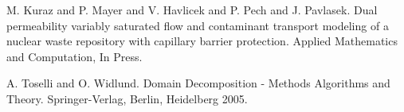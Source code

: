 
\begin{thebibliography}{10}

{\sc M. Kuraz and P. Mayer and V. Havlicek and P. Pech and J. Pavlasek}. {Dual permeability variably saturated flow and contaminant transport modeling of a nuclear waste repository with capillary barrier protection}. Applied Mathematics and Computation, In Press.



{\sc A. Toselli and O. Widlund}. {Domain Decomposition - Methods Algorithms and Theory}. Springer-Verlag, Berlin, Heidelberg 2005.

\end{thebibliography}
